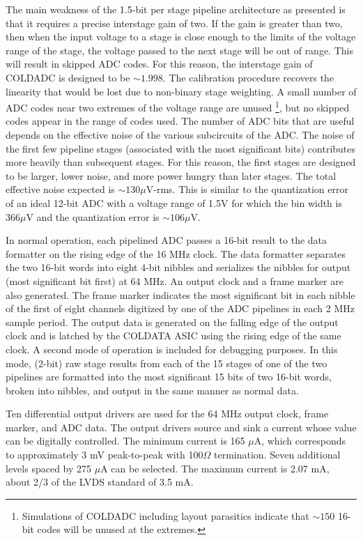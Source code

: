The main weakness of the 1.5-bit per stage pipeline architecture as presented is that it requires a precise interstage gain of two.  If the gain is greater than two, then when the input voltage to a stage is close enough to the limits of the voltage range of the stage, the voltage passed to the next stage will be out of range.  This will result in skipped ADC codes.  For this reason, the interstage gain of COLDADC is designed to be $\sim1.998$.  The calibration procedure recovers the linearity that would be lost due to non-binary stage weighting.  A small number of ADC codes near two extremes of the voltage range are 
unused \footnote{Simulations of COLDADC including layout parasitics indicate that $\sim150$ 16-bit codes will be unused at the extremes.}, but no skipped codes appear in the range of codes used.  The number of ADC bits that are useful depends on the effective noise of the various subcircuits of the ADC.  The noise of the first few pipeline stages (associated with the most significant bits) contributes more heavily than subsequent stages.  For this reason, the first stages are designed to be larger, lower noise, and more power hungry than later stages.  The total effective noise expected is $\sim130 \mu$V-rms.  This is similar to the quantization error of an ideal 12-bit ADC with a voltage range of 1.5V for which the bin width is $366 \mu$V and the quantization error is $\sim106 \mu$V.

In normal operation, each pipelined ADC passes a 16-bit result to the data formatter on the rising edge of the 16 MHz clock.  The data formatter separates the two 16-bit words into eight 4-bit nibbles and serializes the nibbles for output (most significant bit first) at 64 MHz.  An output clock and a frame marker are also generated.  The frame marker indicates the most significant bit in each nibble of the first of eight channels digitized by one of the ADC pipelines in each 2 MHz sample period.  The output data is generated on the falling edge of the output clock and is latched by the COLDATA ASIC using the rising edge of the same clock.
A second mode of operation is included for debugging purposes.  In this mode, (2-bit) raw stage results from each of the 15 stages of one of the two pipelines are formatted into the most significant 15 bits of two 16-bit words, broken into nibbles, and output in the same manner as normal data.

Ten differential output drivers are used for the 64 MHz output clock, frame marker, and ADC data.  The output drivers source and sink a current whose value can be digitally controlled.  The minimum current is 165 $\mu$A, which corresponds to approximately 3 mV peak-to-peak with 100$\Omega$ termination.  Seven additional levels spaced by 275 $\mu$A can be selected.  The maximum current is 2.07 mA, about 2/3 of the LVDS standard of 3.5 mA.

